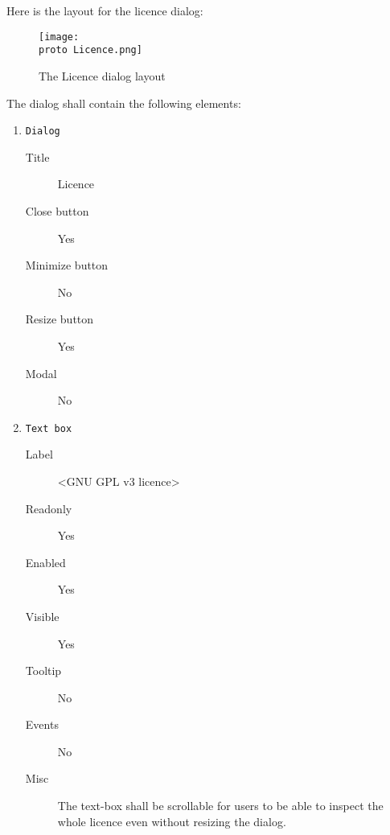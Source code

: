 Here is the layout for the licence dialog:

\begin{figure}[H]
  \texttt{[image: \\proto Licence.png]}
  \caption{The Licence dialog layout}
  \label{fig:Licence}
\end{figure}

The dialog shall contain the following elements:

\begin{enumerate}

    \item \texttt{Dialog}
              \begin{description}
                  \item[Title] Licence
                  \item[Close button] Yes
                  \item[Minimize button] No
                  \item[Resize button] Yes
                  \item[Modal] No
              \end{description}

    \item \texttt{Text box}
              \begin{description}
                  \item[Label] <GNU GPL v3 licence>
                  \item[Readonly] Yes
                  \item[Enabled] Yes
                  \item[Visible] Yes
                  \item[Tooltip] No
                  \item[Events] No
                  \item[Misc] The text-box shall be scrollable for users to be
                              able to inspect the whole licence even without
                              resizing the dialog.
              \end{description}

\end{enumerate}

